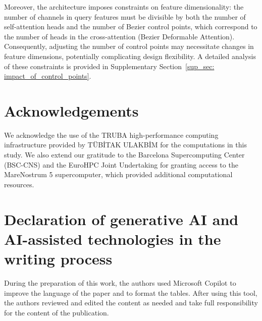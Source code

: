 Moreover, the architecture imposes constraints on feature dimensionality: the number of channels in query features must be divisible by both the number of self-attention heads and the number of Bezier control points, which correspond to the number of heads in the cross-attention (Bezier Deformable Attention). Consequently, adjusting the number of control points may necessitate changes in feature dimensions, potentially complicating design flexibility. A detailed analysis of these constraints is provided in Supplementary Section~\ref{sup_sec: impact_of_control_points}.


\section*{Acknowledgements}

We acknowledge the use of the TRUBA high-performance computing infrastructure provided by TÜBİTAK ULAKBİM for the computations in this study. We also extend our gratitude to the Barcelona Supercomputing Center (BSC-CNS) and the EuroHPC Joint Undertaking for granting access to the MareNostrum 5 supercomputer, which provided additional computational resources.

\section*{Declaration of generative AI and AI-assisted technologies in the writing process}

During the preparation of this work, the authors used Microsoft Copilot to improve the language of the paper and to format the tables. After using this tool, the authors reviewed and edited the content as needed and take full responsibility for the content of the publication.